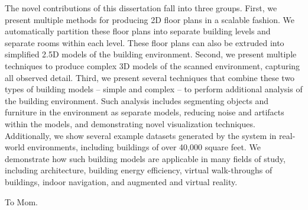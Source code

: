 \documentclass[12pt,onecolumn,oneside]{book}
\begin{document}
The novel contributions of this dissertation fall into three groups.  First, we present multiple methods for producing 2D floor plans in a scalable fashion.  We automatically partition these floor plans into separate building levels and separate rooms within each level.  These floor plans can also be extruded into simplified 2.5D models of the building environment.  Second, we present multiple techniques to produce complex 3D models of the scanned environment, capturing all observed detail.  Third, we present several techniques that combine these two types of building models -- simple and complex -- to perform additional analysis of the building environment.  Such analysis includes segmenting objects and furniture in the environment as separate models, reducing noise and artifacts within the models, and demonstrating novel visualization techniques.  Additionally, we show several example datasets generated by the system in real-world environments, including buildings of over 40,000 square feet.  We demonstrate how such building models are applicable in many fields of study, including architecture, building energy efficiency, virtual walk-throughs of buildings, indoor navigation, and augmented and virtual reality.


\newpage
{}
\setcounter{page}{1}

\clearpage
\vspace*{\fill}
\begin{center}
To Mom.
\end{center}
\vfill %
\clearpage

\tableofcontents{}

\cleardoublepage
{}
{}
\listoffigures{}

\end{document}

